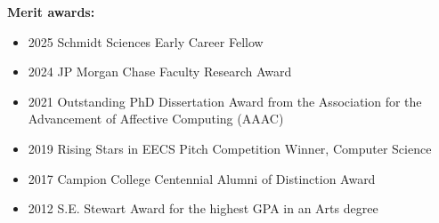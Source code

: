 \documentclass[paper=letter,fontsize=11pt]{scrartcl} %
\begin{document}
\noindent \textbf{Merit awards:}
\begin{itemize}
\item 2025 Schmidt Sciences Early Career Fellow %
\item 2024 JP Morgan Chase Faculty Research Award %
\item 2021 Outstanding PhD Dissertation Award from the Association for the Advancement of Affective Computing (AAAC) %
\item 2019 Rising Stars in EECS Pitch Competition Winner, Computer Science
\item 2017 Campion College Centennial Alumni of Distinction Award
\item 2012 S.E. Stewart Award for the highest GPA in an Arts degree
\end{itemize}
\end{document}
